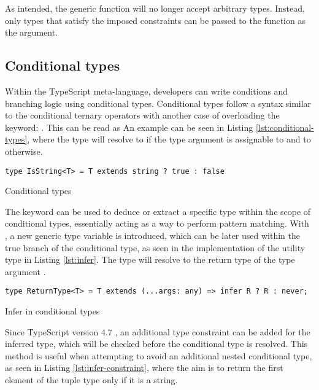 As intended, the generic function will no longer accept arbitrary types. Instead, only types that satisfy the imposed constraints can be passed to the function as the argument.

\subsection{Conditional types}

Within the TypeScript meta-language, developers can write conditions and branching logic using conditional types. Conditional types follow a syntax similar to the conditional ternary operators with another case of overloading the  keyword: . This can be read as  An example can be seen in Listing \ref{lst:conditional-types}, where the  type will resolve to  if the type argument  is assignable to  and to  otherwise.

\begin{listing}[ht]
  \begin{verbatim}
type IsString<T> = T extends string ? true : false
\end{verbatim}
  \caption{Conditional types}\label{lst:conditional-types}
\end{listing}

The  keyword can be used to deduce or extract a specific type within the scope of conditional types, essentially acting as a way to perform pattern matching. With , a new generic type variable is introduced, which can be later used within the true branch of the conditional type, as seen in the implementation of the  utility type in Listing \ref{lst:infer}. The  type will resolve to the return type of the type argument .

\begin{listing}[ht]
  \begin{verbatim}
type ReturnType<T> = T extends (...args: any) => infer R ? R : never;
\end{verbatim}
  \caption{Infer in conditional types}\label{lst:infer}
\end{listing}

Since TypeScript version 4.7 \cite{AnnouncingTypeScript4.7}, an additional type constraint can be added for the inferred type, which will be checked before the conditional type is resolved. This method is useful when attempting to avoid an additional nested conditional type, as seen in Listing \ref{lst:infer-constraint}, where the aim is to return the first element of the tuple type only if it is a string.

